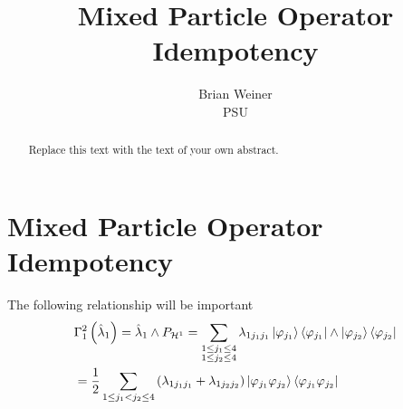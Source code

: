 \documentclass[12pt]{article}
\begin{document}
\title{Mixed Particle Operator Idempotency}
\author{Brian Weiner \\
PSU}
\maketitle

\begin{abstract}
Replace this text with the text of your own abstract.
\end{abstract}

\section{Mixed Particle Operator Idempotency}

The following relationship will be important 
\begin{align*}
& \Gamma _{1}^{2}\left( \hat{\lambda}_{1}\right) =\hat{\lambda}_{1}\wedge P_{%
\mathcal{H}^{1}}=\sum_{\substack{ 1\leq j_{1}\leq 4  \\ 1\leq j_{2}\leq 4}}%
\lambda _{1j_{1}j_{1}}\left\vert \varphi _{j_{1}}\right\rangle \left\langle
\varphi _{j_{1}}\right\vert \wedge \left\vert \varphi _{j_{2}}\right\rangle
\left\langle \varphi _{j_{2}}\right\vert \\
& =\frac{1}{2}\sum_{1\leq j_{1}<j_{2}\leq 4}\left( \lambda
_{1j_{1}j_{1}}+\lambda _{1j_{2}j_{2}}\right) \left\vert \varphi
_{j_{1}}\varphi _{j_{2}}\right\rangle \left\langle \varphi _{j_{1}}\varphi
_{j_{2}}\right\vert
\end{align*}
\end{document}
